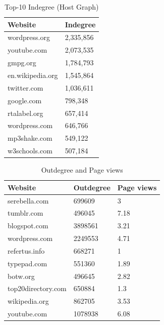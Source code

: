\begin{table}[H]
	\caption{Top-10 Indegree (Host Graph)}
	\label{t4a}
	\begin{center}
		\begin{tabular}{|l|l|}
			\hline
			Website	&Indegree \\ \hline
			wordpress.org	&2,335,856 \\ \hline
			youtube.com	&2,073,535 \\ \hline
			gmpg.org	&1,784,793 \\ \hline
			en.wikipedia.org	&1,545,864 \\ \hline
			twitter.com	&1,036,611 \\ \hline
			google.com	&798,348 \\ \hline
			rtalabel.org	&657,414 \\ \hline
			wordpress.com	&646,766 \\ \hline
			mp3shake.com	&549,122 \\ \hline
			w3schools.com	&507,184 \\ \hline
		\end{tabular}
	\end{center}
\end{table}

\begin{table}[H]
	\caption{Outdegree and Page views}
	\label{t4}
	\begin{center}
		\begin{tabular}{|l|l|l|}
			\hline
			Website	&Outdegree	&Page views \\ \hline
			serebella.com	&699609	&3 \\ \hline
			tumblr.com	&496045	&7.18 \\ \hline
			blogspot.com	&3898561	&3.21 \\ \hline
			wordpress.com	&2249553	&4.71 \\ \hline
			refertus.info	&668271	&1 \\ \hline
			typepad.com	&551360	&1.89 \\ \hline
			botw.org	&496645	&2.82 \\ \hline
			top20directory.com	&650884	&1.3 \\ \hline
			wikipedia.org	&862705	&3.53 \\ \hline	
			youtube.com	&1078938	&6.08 \\ \hline			
		\end{tabular}
	\end{center}
\end{table}